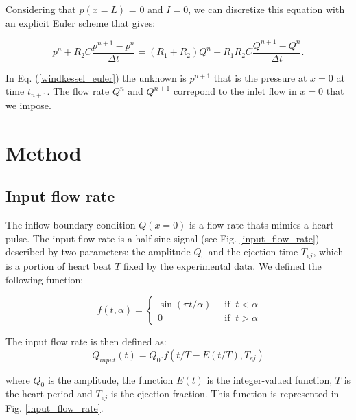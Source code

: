 \documentclass{config}
\begin{document}
Considering that $p(x=L)$ = 0 and $I=0$, we can discretize this equation with an explicit Euler scheme that gives:

\begin{equation}\label{windkessel_euler}
p^n+ R_2 C \frac{p^{n+1} - p^n}{\Delta t} = (R_1 + R_2) Q^n + R_1 R_2 C \frac{Q^{n+1} - Q^n}{\Delta t}.
\end{equation}

In Eq. (\ref{windkessel_euler}) the unknown is $p^{n+1}$ that is the pressure at $x=0$ at time $t_{n+1}$. The flow rate $Q^n$ and $Q^{n+1}$ correpond to the inlet flow in $x=0$ that we impose. 

\section{Method}

\subsection{Input flow rate}

The inflow boundary condition $Q(x=0)$ is a flow rate thats mimics a heart pulse. The input flow rate is a half sine signal (see Fig. \ref{input_flow_rate}) described by two parameters: the amplitude $Q_0$ and the ejection time $T_{ej}$, which is a portion of heart beat $T$ fixed by the experimental data. We defined the following function: 

\begin{equation}\
f(t,\alpha) = \left\{ \begin{array}{ll}
\displaystyle \sin (\pi t/\alpha)  & ~ \text{ if }   ~ t < \alpha \\ 
\displaystyle 0    & ~ \text{ if }   ~ t > \alpha
\end{array} \right.
\end{equation}

The input flow rate is then defined as: 
\begin{equation}
Q_{input} (t) = Q_0 .  f(t/T - E(t/T), T_{ej})
\end{equation}

where $Q_0$ is the amplitude,  the function $E(t)$ is the integer-valued function, $T$ is the heart period and $T_{ej}$ is the ejection fraction. This function is represented in Fig. \ref{input_flow_rate}.
\end{document}
